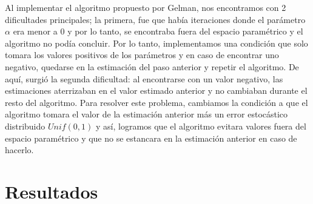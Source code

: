 \documentclass[9pt,twocolumn,twoside,]{pnas-new}
\begin{document}
Al implementar el algoritmo propuesto por Gelman, nos encontramos con 2
dificultades principales; la primera, fue que había iteraciones donde el
parámetro \(\alpha\) era menor a 0 y por lo tanto, se encontraba fuera
del espacio paramétrico y el algoritmo no podía concluir. Por lo tanto,
implementamos una condición que solo tomara los valores positivos de los
parámetros y en caso de encontrar uno negativo, quedarse en la
estimación del paso anterior y repetir el algoritmo. De aquí, surgió la
segunda dificultad: al encontrarse con un valor negativo, las
estimaciones aterrizaban en el valor estimado anterior y no cambiaban
durante el resto del algoritmo. Para resolver este problema, cambiamos
la condición a que el algoritmo tomara el valor de la estimación
anterior más un error estocástico distribuido \(Unif(0,1)\) y así,
logramos que el algoritmo evitara valores fuera del espacio paramétrico
y que no se estancara en la estimación anterior en caso de hacerlo.

\hypertarget{resultados}{%
\section*{Resultados}\label{resultados}}
\end{document}
